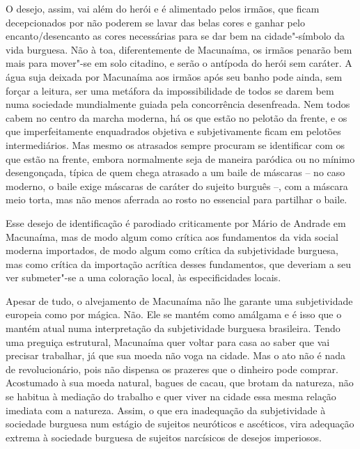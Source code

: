 O desejo, assim, vai além do herói e é alimentado pelos irmãos, que
ficam decepcionados por não poderem se lavar das belas cores e ganhar
pelo encanto/desencanto as cores necessárias para se dar bem na
cidade"-símbolo da vida burguesa. Não à toa, diferentemente de Macunaíma,
os irmãos penarão bem mais para mover"-se em solo citadino, e serão o
antípoda do herói sem caráter. A água suja deixada por Macunaíma aos
irmãos após seu banho pode ainda, sem forçar a leitura, ser uma metáfora
da impossibilidade de todos se darem bem numa sociedade mundialmente
guiada pela concorrência desenfreada. Nem todos cabem no centro da
marcha moderna, há os que estão no pelotão da frente, e os que
imperfeitamente enquadrados objetiva e subjetivamente ficam em pelotões
intermediários. Mas mesmo os atrasados sempre procuram se identificar
com os que estão na frente, embora normalmente seja de maneira paródica
ou no mínimo desengonçada, típica de quem chega atrasado a um baile de
máscaras -- no caso moderno, o baile exige máscaras de caráter do
sujeito burguês --, com a máscara meio torta, mas não menos aferrada ao
rosto no essencial para partilhar o baile.

Esse desejo de identificação é parodiado criticamente por Mário de
Andrade em Macunaíma, mas de modo algum como crítica aos fundamentos da
vida social moderna importados, de modo algum como crítica da
subjetividade burguesa, mas como crítica da importação acrítica desses
fundamentos, que deveriam a seu ver submeter"-se a uma coloração local,
às especificidades locais.

Apesar de tudo, o alvejamento de Macunaíma não lhe garante uma
subjetividade europeia como por mágica. Não. Ele se mantém como amálgama
e é isso que o mantém atual numa interpretação da subjetividade burguesa
brasileira. Tendo uma preguiça estrutural, Macunaíma quer voltar para
casa ao saber que vai precisar trabalhar, já que sua moeda não voga na
cidade. Mas o ato não é nada de revolucionário, pois não dispensa os
prazeres que o dinheiro pode comprar. Acostumado à sua moeda natural,
bagues de cacau, que brotam da natureza, não se habitua à mediação do
trabalho e quer viver na cidade essa mesma relação imediata com a
natureza. Assim, o que era inadequação da subjetividade à sociedade
burguesa num estágio de sujeitos neuróticos e ascéticos, vira adequação
extrema à sociedade burguesa de sujeitos narcísicos de desejos
imperiosos.

